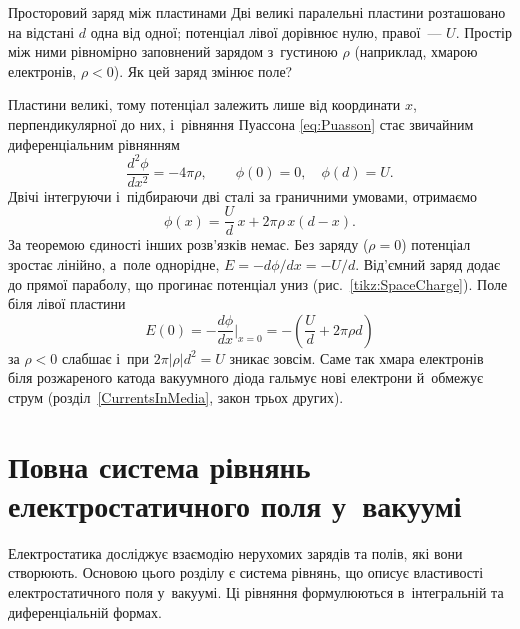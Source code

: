 \begin{Example}{Просторовий заряд між пластинами}
	Дві великі паралельні пластини розташовано на відстані $d$ одна від одної; потенціал
	лівої дорівнює нулю, правої~--- $U$. Простір між ними рівномірно заповнений зарядом
	з~густиною $\rho$ (наприклад, хмарою електронів, $\rho<0$). Як цей заряд змінює поле?

	Пластини великі, тому потенціал залежить лише від координати $x$, перпендикулярної до
	них, і~рівняння Пуассона \eqref{eq:Puasson} стає звичайним диференціальним рівнянням
	\begin{equation*}
		\frac{d^2\phi}{dx^2} = -4\pi\rho,
		\qquad \phi(0) = 0,\quad \phi(d) = U.
	\end{equation*}
	Двічі інтегруючи і~підбираючи дві сталі за граничними умовами, отримаємо
	\begin{equation*}
		\phi(x) = \frac{U}{d}\,x + 2\pi\rho\,x(d-x).
	\end{equation*}
	За теоремою єдиності інших розв'язків немає. Без заряду ($\rho=0$) потенціал зростає
	лінійно, а~поле однорідне, $E = -d\phi/dx = -U/d$. Від'ємний заряд додає до прямої
	параболу, що прогинає потенціал униз (рис.~\ref{tikz:SpaceCharge}). Поле біля лівої
	пластини
	\begin{equation*}
		E(0) = -\frac{d\phi}{dx}\Big|_{x=0} = -\left(\frac{U}{d} + 2\pi\rho d\right)
	\end{equation*}
	за $\rho<0$ слабшає і~при $2\pi|\rho|d^2 = U$ зникає зовсім. Саме так хмара електронів
	біля розжареного катода вакуумного діода гальмує нові електрони й~обмежує струм
	(розділ~\ref{CurrentsInMedia}, закон трьох других).
\end{Example}



\section{Повна система рівнянь електростатичного поля у~вакуумі}\hypertarget{electrostatics-equations-system}{}

Електростатика досліджує взаємодію нерухомих зарядів та полів, які вони створюють. Основою
цього розділу є система рівнянь, що описує властивості електростатичного поля у~вакуумі.
Ці рівняння формулюються в~інтегральній та диференціальній формах.



